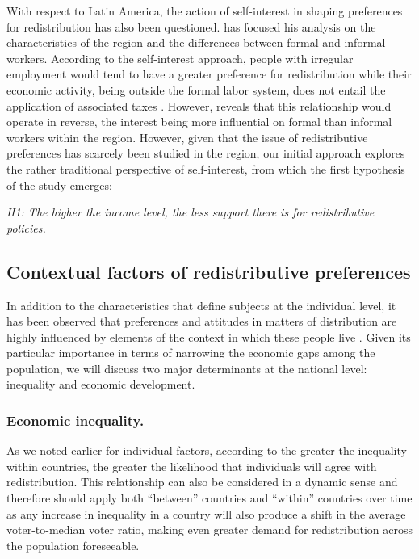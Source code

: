 \documentclass[utf8]{frontiersSCNS} %
\begin{document}
With respect to Latin America, the action of self-interest in shaping preferences for redistribution has also been questioned. \textcite{Berensexclusioncalculatingsolidarity2015} has focused his analysis on the characteristics of the region and the differences between formal and informal workers. According to the self-interest approach, people with irregular employment would tend to have a greater preference for redistribution while their economic activity, being outside the formal labor system, does not entail the application of associated taxes \textcite{Schmidt-CatranEconomicinequalitypublic2016}. However, \textcite{Berensexclusioncalculatingsolidarity2015} reveals that this relationship would operate in reverse, the interest being more influential on formal than informal workers within the region. However, given that the issue of redistributive preferences has scarcely been studied in the region, our initial approach explores the rather traditional perspective of self-interest, from which the first hypothesis of the study emerges:

\textit{H1: The higher the income level, the less support there is for redistributive policies.}

\subsection{Contextual factors of redistributive preferences}

In addition to the characteristics that define subjects at the individual level, it has been observed that preferences and attitudes in matters of distribution are highly influenced by elements of the context in which these people live \parencite{WegenerDominantideologiesvariation1995, ForsePerceptioninegaliteseconomiques2007}. Given its particular importance in terms of narrowing the economic gaps among the population, we will discuss two major determinants at the national level: inequality and economic development.

\subsubsection{Economic inequality.}

As we noted earlier for individual factors, according to \textcite{MeltzerRationalTheorySize1981} the greater the inequality within countries, the greater the likelihood that individuals will agree with redistribution. This relationship can also be considered in a dynamic sense and therefore should apply both “between” countries and “within” countries over time as any increase in inequality in a country will also produce a shift in the average voter-to-median voter ratio, making even greater demand for redistribution across the population foreseeable.
\end{document}
